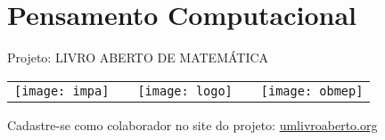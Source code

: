 \ifnum{}
\renewcommand\chapterillustration{./abertura-computacional}
\else
\renewcommand\chapterillustration{./abertura-computacional-professor}
\fi

\renewcommand\chapterwhat{Pensamento computacional e noções básicas de linguagem de programação.
}
\renewcommand\chapterbecause{Os computadores estão presentes em quase todas as atividades humanas na atualidade e, por isso, desenvolver o pensamento computacional e conhecer noções básicas de linguagens de programação pode ser fundamental para sua vida profissional, trajetória acadêmica e participação efetiva na sociedade.
} 
\chapter{Pensamento Computacional}
\label{computacional-chap}

\mbox{}\thispagestyle{empty}\clearpage

\thispagestyle{empty}

\begin{center}
Projeto: LIVRO ABERTO DE MATEMÁTICA

\noindent \begin{tabular}{lcccr}
\texttt{[image: impa]}& \quad\quad& \texttt{[image: logo]} & \quad\quad& \texttt{[image: obmep]} 
\end{tabular}
\end{center}

\vspace*{.3cm}

Cadastre-se como colaborador no site do projeto: \url{umlivroaberto.org}




